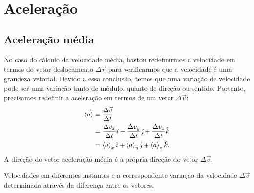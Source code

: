 \section{Aceleração}

\subsection{Aceleração média}

No caso do cálculo da velocidade média, bastou redefinirmos a velocidade em termos do vetor deslocamento $\Delta\vec{r}$ para verificarmos que a velocidade é uma grandeza vetorial. Devido a essa conclusão, temos que uma variação de velocidade pode ser uma variação tanto de módulo, quanto de direção ou sentido. Portanto, precisamos redefinir a aceleração em termos de um vetor $\Delta\vec{v}$:
\begin{align}
  \vec{\left\langle{a}\right\rangle} &= \frac{\Delta\vec{v}}{\Delta t} \\
  &= \frac{\Delta v_x}{\Delta t}\hat{\imath} + \frac{\Delta v_y}{\Delta t}\hat{\jmath} + \frac{\Delta v_z}{\Delta t}\hat{k} \\
  &= \left\langle{a}\right\rangle_x\hat{\imath} + \left\langle{a}\right\rangle_y\hat{\jmath} + \left\langle{a}\right\rangle_z\hat{k}.
\end{align} 
%
A direção do vetor aceleração média é a própria direção do vetor $\Delta{\vec{v}}$. 

\begin{marginfigure}[-3cm]
   \caption{Velocidades em diferentes instantes e a correspondente variação da velocidade $\Delta\vec{v}$ determinada através da diferença entre os vetores.}
\end{marginfigure}

